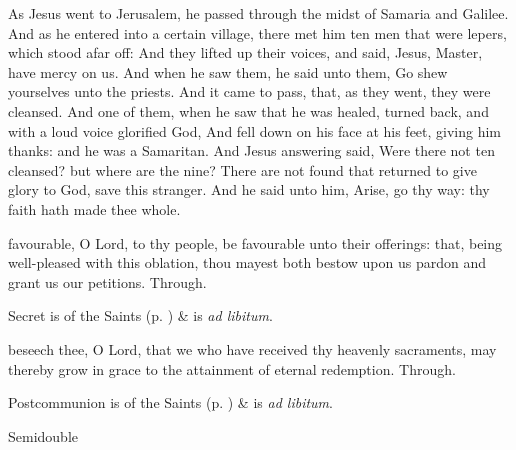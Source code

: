 
 As Jesus went to Jerusalem, he passed through the midst of Samaria and Galilee. And as he entered into a certain village, there met him ten men that were lepers, which stood afar off: And they lifted up their voices, and said, Jesus, Master, have mercy on us. And when he saw them, he said unto them, Go shew yourselves unto the priests. And it came to pass, that, as they went, they were cleansed. And one of them, when he saw that he was healed, turned back, and with a loud voice glorified God, And fell down on his face at his feet, giving him thanks: and he was a Samaritan. And Jesus answering said, Were there not ten cleansed? but where are the nine? There are not found that returned to give glory to God, save this stranger. And he said unto him, Arise, go thy way: thy faith hath made thee whole.


\secret
{} favourable, O Lord, to thy people, be favourable unto their offerings: that, being well-pleased with this oblation, thou mayest both bestow upon us pardon and grant us our petitions. Through.
\begin{rubric}
     Secret is of the Saints (p. \pageref{SPSaints}) \&  is \emph{ad libitum}.
\end{rubric}


\postcommunion
{} beseech thee, O Lord, that we who have received thy heavenly sacraments, may thereby grow in grace to the attainment of eternal redemption. Through.
\begin{rubric}
     Postcommunion is of the Saints (p. \pageref{SPSaints}) \&  is \emph{ad libitum}.
\end{rubric}

\begin{inhead}
{Semidouble}
\end{inhead}
\par\noindent
{}

